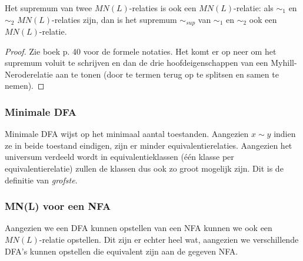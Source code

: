 \begin{theory}
  Het supremum van twee $MN(L)$-relaties is ook een $MN(L)$-relatie: als $\sim_1$ en $\sim_2$ $MN(L)$-relaties zijn, dan is het supremum $\sim_{sup}$ van $\sim_1$ en $\sim_2$ ook een $MN(L)$-relatie.
\end{theory}

\begin{proof}
  Zie boek p. 40 voor de formele notaties. Het komt er op neer om het supremum voluit te schrijven en dan de drie hoofdeigenschappen van een Myhill-Neroderelatie aan te tonen (door te termen terug op te splitsen en samen te nemen).
\end{proof}

\subsubsection*{Minimale DFA}

Minimale DFA wijst op het minimaal aantal toestanden. Aangezien $x \sim y$ indien ze in beide toestand eindigen, zijn er minder equivalentierelaties. Aangezien het universum verdeeld wordt in equivalentieklassen (\'e\'en klasse per equivalentierelatie) zullen de klassen dus ook zo groot mogelijk zijn. Dit is de definitie van \emph{grofste}.

\subsubsection*{MN(L) voor een NFA}

Aangezien we een DFA kunnen opstellen van een NFA kunnen we ook een $MN(L)$-relatie opstellen. Dit zijn er echter heel wat, aangezien we verschillende DFA's kunnen opstellen die equivalent zijn aan de gegeven NFA.
